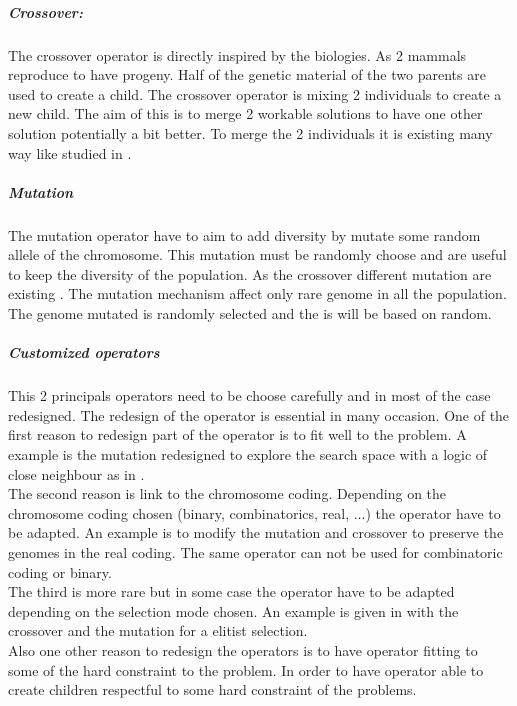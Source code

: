  
\subparagraph{Crossover:} 

The crossover operator is directly inspired by the biologies. As 2 mammals reproduce to have progeny. Half of the genetic material of the two parents are used to create a child.
The crossover operator is mixing 2 individuals to create a new child. The aim of this is to merge 2 workable solutions to have one other solution potentially a bit better. To merge the 2 individuals it is existing many way like studied in \cite{113*mais2010}.
 
 \subparagraph{Mutation}
The mutation operator have to aim to add diversity by mutate some random allele of the chromosome. This mutation must be randomly choose and are useful to keep the diversity of the population. As the crossover different mutation are existing \cite{113*mais2010}. The mutation mechanism affect only rare genome in all the population. The genome mutated is randomly selected and the is will be based on random. 

\subparagraph*{Customized operators}
This 2 principals operators need to be choose carefully and in most of the case redesigned.
The redesign of the operator is essential in many occasion.
One of the first reason to redesign part of the operator is to fit well to the problem. A example is the mutation redesigned to explore the search space with a logic of close neighbour as in \cite{68*muhlenbein1989}.\\
The second reason is link to the chromosome coding. Depending on the chromosome coding chosen (binary, combinatorics, real, ...) the operator have to be adapted. An example is to modify the mutation and crossover to preserve the genomes in the real coding. The same operator can not be used for combinatoric coding or binary.\\
The third is more rare but in some case the operator have to be adapted depending on the selection mode chosen. An example is  given in  \cite{65*thierens1994} with the crossover and the mutation for a elitist selection. \\
Also one other reason to redesign the operators is to have operator fitting  to some of the hard constraint to the problem. In order to have operator able to create children respectful to some hard constraint of the problems.


